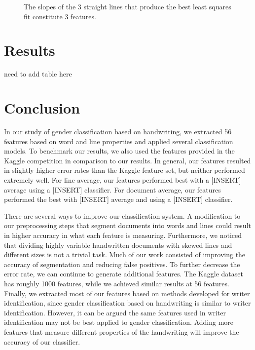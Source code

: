 \documentclass[paper=a4, fontsize=11pt]{scrartcl} %
\numberwithin{equation}{section} %
\numberwithin{figure}{section} %
\numberwithin{table}{section} %
\begin{document}
\begin{figure}
  \caption{The slopes of the 3 straight lines that produce the best
    least squares fit constitute 3 features.}
  \label{fig:fractaldimension}
\end{figure}

\section{Results}
need to add table here
\label{sec:results}
\section{Conclusion}
In our study of gender classification based on handwriting, we
extracted 56 features based on word and line properties and applied
several classification models. To benchmark our results, we also used
the features provided in the Kaggle competition in comparison to our
results. In general, our features resulted in slightly higher error
rates than the Kaggle feature set, but neither performed extremely
well. For line average, our features performed best with a [INSERT]
average using a [INSERT] classifier. For document average, our
features performed the best with [INSERT] average and using a [INSERT]
classifier.

There are several ways to improve our classification system. A
modification to our preprocessing steps that segment documents into
words and lines could result in higher accuracy in what each feature
is measuring. Furthermore, we noticed that dividing highly variable
handwritten documents with skewed lines and different sizes is not a
trivial task. Much of our work consisted of improving the accuracy of
segmentation and reducing false positives. To further decrease the
error rate, we can continue to generate additional features. The
Kaggle dataset has roughly 1000 features, while we achieved similar
results at 56 features. Finally, we extracted most of our features
based on methods developed for writer identification, since gender
classification based on handwriting is similar to writer
identification. However, it can be argued the same features used in
writer identification may not be best applied to gender
classification. Adding more features that measure different properties
of the handwriting will improve the accuracy of our classifier.



\end{document}

